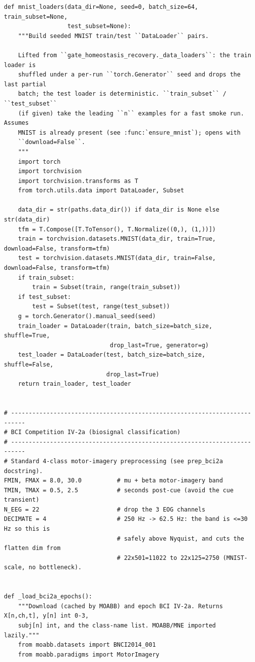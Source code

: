 \begin{lstlisting}[caption={mnn\_torch/data.py},label={lst:mnn-src-data}]
def mnist_loaders(data_dir=None, seed=0, batch_size=64, train_subset=None,
                  test_subset=None):
    """Build seeded MNIST train/test ``DataLoader`` pairs.

    Lifted from ``gate_homeostasis_recovery._data_loaders``: the train loader is
    shuffled under a per-run ``torch.Generator`` seed and drops the last partial
    batch; the test loader is deterministic. ``train_subset`` / ``test_subset``
    (if given) take the leading ``n`` examples for a fast smoke run. Assumes
    MNIST is already present (see :func:`ensure_mnist`); opens with
    ``download=False``.
    """
    import torch
    import torchvision
    import torchvision.transforms as T
    from torch.utils.data import DataLoader, Subset

    data_dir = str(paths.data_dir()) if data_dir is None else str(data_dir)
    tfm = T.Compose([T.ToTensor(), T.Normalize((0,), (1,))])
    train = torchvision.datasets.MNIST(data_dir, train=True, download=False, transform=tfm)
    test = torchvision.datasets.MNIST(data_dir, train=False, download=False, transform=tfm)
    if train_subset:
        train = Subset(train, range(train_subset))
    if test_subset:
        test = Subset(test, range(test_subset))
    g = torch.Generator().manual_seed(seed)
    train_loader = DataLoader(train, batch_size=batch_size, shuffle=True,
                              drop_last=True, generator=g)
    test_loader = DataLoader(test, batch_size=batch_size, shuffle=False,
                             drop_last=True)
    return train_loader, test_loader


# --------------------------------------------------------------------------
# BCI Competition IV-2a (biosignal classification)
# --------------------------------------------------------------------------
# Standard 4-class motor-imagery preprocessing (see prep_bci2a docstring).
FMIN, FMAX = 8.0, 30.0          # mu + beta motor-imagery band
TMIN, TMAX = 0.5, 2.5           # seconds post-cue (avoid the cue transient)
N_EEG = 22                      # drop the 3 EOG channels
DECIMATE = 4                    # 250 Hz -> 62.5 Hz: the band is <=30 Hz so this is
                                # safely above Nyquist, and cuts the flatten dim from
                                # 22x501=11022 to 22x125=2750 (MNIST-scale, no bottleneck).


def _load_bci2a_epochs():
    """Download (cached by MOABB) and epoch BCI IV-2a. Returns X[n,ch,t], y[n] int 0-3,
    subj[n] int, and the class-name list. MOABB/MNE imported lazily."""
    from moabb.datasets import BNCI2014_001
    from moabb.paradigms import MotorImagery


\end{lstlisting}
